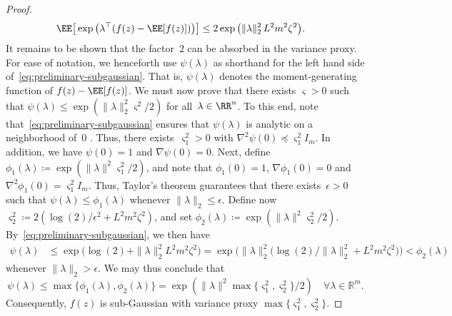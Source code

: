 \documentclass[11pt]{article}
\begin{document}
\begin{proof}
\begin{align}
    \label{eq:preliminary-subgaussian}
    \EE\big[ \exp\big(\lambda^\top(f(z)-\EE[f(z)])\big) \big]
    & \leq 2\exp\big(\|\lambda\|_2^2 \, L^2m^2\zeta^2 \big).
\end{align}
It remains to be shown that the factor~$2$ can be absorbed in the variance proxy. For ease of notation, we henceforth use $\psi(\lambda)$ as shorthand for the left hand side of~\eqref{eq:preliminary-subgaussian}. That is, $\psi(\lambda)$ denotes the moment-generating function of $f(z)-\EE[f(z)]$. We must now prove that there exists $\varsigma>0$ such that $\psi(\lambda)\leq \exp(\|\lambda\|_2^2\varsigma^2/2)$ for all~$\lambda\in\RR^n$. To this end, note that~\eqref{eq:preliminary-subgaussian} ensures that $\psi(\lambda)$ is analytic on a neighborhood of~$0$ \cite[Section~2]{wainwright2019high}. Thus, there exists~$\varsigma^2_1>0$ with $\nabla^2\psi(0)\preceq \varsigma_1^2 I_m$. In addition, we have $\psi(0)=1$ and $\nabla\psi(0)=0$. Next, define $\phi_1(\lambda) \coloneqq \exp(\|\lambda\|^2 \varsigma_1^2 / 2)$, and note that $\phi_1(0)= 1$, $\nabla \phi_1(0) = 0$ and $\nabla^2 \phi_1(0) = \varsigma_1^2 I_m$. Thus, Taylor's theorem guarantees that there exists~$\epsilon>0$ such that $\psi(\lambda)\leq \phi_1(\lambda)$ whenever $\|\lambda\|_2\leq \epsilon$. Define now $\varsigma_2^2\coloneqq 2(\log(2)/\epsilon^2 + L^2m^2\zeta^2)$, and set $\phi_2(\lambda)\coloneqq \exp(\|\lambda\|^2 \varsigma_2^2 / 2)$. By~\eqref{eq:preliminary-subgaussian}, we then have
\begin{align*}
    \psi(\lambda) &\leq  \exp\big(\log(2) + \|\lambda\|_2^2L^2m^2\zeta^2\big) = \exp\Big(\|\lambda\|_2^2 \big(\log(2)/ \|\lambda\|_2^2 + L^2m^2\zeta^2 \big)\Big) 
    < \phi_2(\lambda)
\end{align*}
whenever $\|\lambda\|_2>\epsilon$. We may thus conclude that 
\[
    \psi(\lambda)\leq \max\{\phi_1(\lambda),\phi_2(\lambda)\} = \exp\left( \|\lambda\|^2 \max\{\varsigma_1^2, \varsigma_2^2\}/2 \right) \quad \forall \lambda\in\mathbb R^m .
\]
Consequently, $f(z)$ is sub-Gaussian with variance proxy $\max\{\varsigma_1^2, \varsigma_2^2\}$.


\end{proof}
\end{document}
